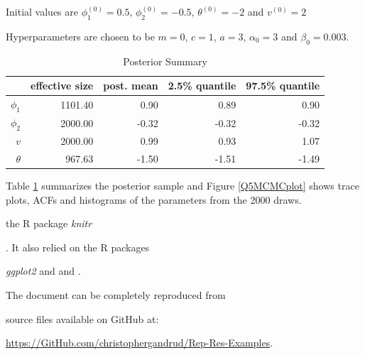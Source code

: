 \documentclass[12pt]{article}\usepackage[]{graphicx}\usepackage[]{color}
\begin{document}
\begin{enumerate}
	Initial values are $\phi_1^{(0)} = 0.5$, $\phi_2^{(0)} = \ensuremath{-0.5}$, $\theta^{(0)} = \ensuremath{-2}$ and $v^{(0)} = 2$
	
	Hyperparameters are chosen to be $m = 0$, $c = 1$, $a = 3$, $\alpha_0 = 3$ and $\beta_0 = 0.003$.
	
\begin{table}[ht]
\centering
\begin{tabular}{rrrrr}
  \hline
 & effective size & post. mean & 2.5\% quantile & 97.5\% quantile \\ 
  \hline
$\phi_1$ & 1101.40 & 0.90 & 0.89 & 0.90 \\ 
  $\phi_2$ & 2000.00 & -0.32 & -0.32 & -0.32 \\ 
  $v$ & 2000.00 & 0.99 & 0.93 & 1.07 \\ 
  $\theta$ & 967.63 & -1.50 & -1.51 & -1.49 \\ 
   \hline
\end{tabular}
\caption{Posterior Summary} 
\label{MCMCresult}
\end{table}

	
	Table \ref{MCMCresult} summarizes the posterior sample and Figure \ref{Q5MCMCplot} shows trace plots, ACFs and histograms of the parameters from the 2000 draws. 
\end{enumerate}



the R package \emph{knitr}

\citep{R-knitr}. It also relied on the R packages

\emph{ggplot2} \citep{R-coda} and \citep{R-repmis} and \citep{R-fields}.

The document can be completely reproduced from

source files available on GitHub at:

\url{https://GitHub.com/christophergandrud/Rep-Res-Examples}.

\clearpage
\newpage
\newpage
\end{document}
